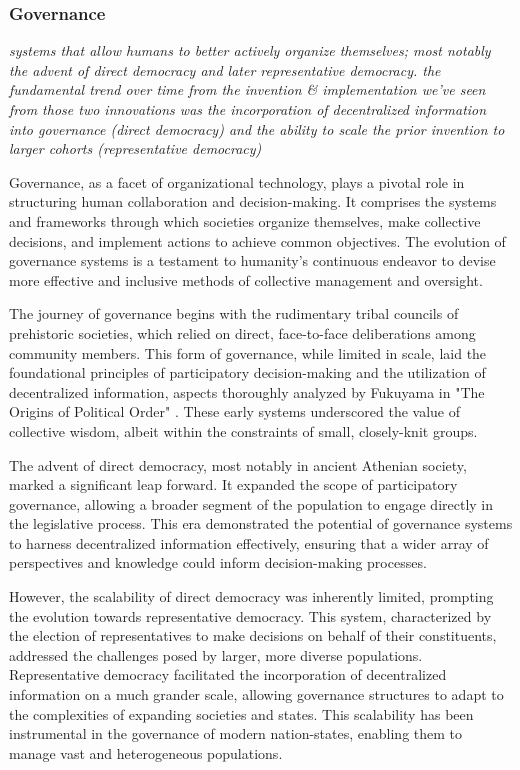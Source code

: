 \documentclass{article}
\begin{document}
\subsubsection{Governance}
\label{sec:Governance}

\textit{systems that allow humans to better actively organize themselves; most notably the advent of direct democracy and later representative democracy. the fundamental trend over time from the invention \& implementation we've seen from those two innovations was the incorporation of decentralized information into governance (direct democracy) and the ability to scale the prior invention to larger cohorts (representative democracy)}

Governance, as a facet of organizational technology, plays a pivotal role in structuring human collaboration and decision-making. It comprises the systems and frameworks through which societies organize themselves, make collective decisions, and implement actions to achieve common objectives. The evolution of governance systems is a testament to humanity's continuous endeavor to devise more effective and inclusive methods of collective management and oversight.

The journey of governance begins with the rudimentary tribal councils of prehistoric societies, which relied on direct, face-to-face deliberations among community members. This form of governance, while limited in scale, laid the foundational principles of participatory decision-making and the utilization of decentralized information, aspects thoroughly analyzed by Fukuyama in "The Origins of Political Order" \cite{Fukuyama2011Origins}. These early systems underscored the value of collective wisdom, albeit within the constraints of small, closely-knit groups.

The advent of direct democracy, most notably in ancient Athenian society, marked a significant leap forward. It expanded the scope of participatory governance, allowing a broader segment of the population to engage directly in the legislative process. This era demonstrated the potential of governance systems to harness decentralized information effectively, ensuring that a wider array of perspectives and knowledge could inform decision-making processes.

However, the scalability of direct democracy was inherently limited, prompting the evolution towards representative democracy. This system, characterized by the election of representatives to make decisions on behalf of their constituents, addressed the challenges posed by larger, more diverse populations. Representative democracy facilitated the incorporation of decentralized information on a much grander scale, allowing governance structures to adapt to the complexities of expanding societies and states. This scalability has been instrumental in the governance of modern nation-states, enabling them to manage vast and heterogeneous populations.
\end{document}
